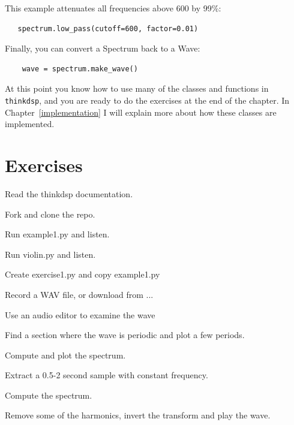 \documentclass[12pt]{book}
\begin{document}
This example attenuates all frequencies above 600 by 99\%:

\begin{verbatim}
   spectrum.low_pass(cutoff=600, factor=0.01)
\end{verbatim}

Finally, you can convert a Spectrum back to a Wave:

\begin{verbatim}
    wave = spectrum.make_wave()
\end{verbatim}

At this point you know how to use many of the classes and functions in
{\tt thinkdsp}, and you are ready to do the exercises at the end of
the chapter.  In Chapter~\ref{implementation} I will explain more
about how these classes are implemented.



\section{Exercises}

\begin{exercise}
Read the thinkdsp documentation.
\end{exercise}

\begin{exercise}
Fork and clone the repo.
\end{exercise}

\begin{exercise}
Run example1.py and listen.
\end{exercise}

\begin{exercise}
Run violin.py and listen.
\end{exercise}

\begin{exercise}
Create exercise1.py and copy example1.py

Record a WAV file, or download from ...

Use an audio editor to examine the wave

Find a section where the wave is periodic and plot a few periods.

Compute and plot the spectrum.
\end{exercise}

\begin{exercise}
Extract a 0.5-2 second sample with constant frequency.

Compute the spectrum.

Remove some of the harmonics, invert the transform and play the wave.
\end{exercise}
\end{document}
